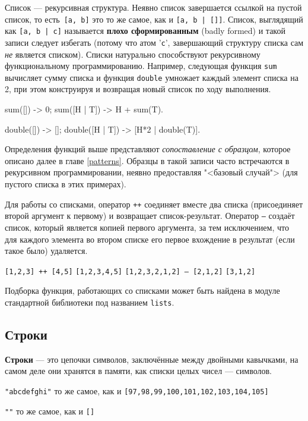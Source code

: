 Список --- рекурсивная структура. Неявно список завершается ссылкой на пустой 
список, то есть~\texttt{[a, b]} это то же самое, как и \texttt{[a, b | []]}. 
Список, выглядящий как \texttt{[a, b | c]} называется \textbf{плохо 
сформированным} (badly formed) и такой записи следует избегать (потому что
атом '\texttt{c}', завершающий структуру списка сам \textit{не} является списком).
Списки натурально способствуют рекурсивному функциональному программированию.
Например, следующая функция \texttt{sum} вычисляет сумму списка и функция 
\texttt{double} умножает каждый элемент списка на 2, при этом конструируя и 
возвращая новый список по ходу выполнения.

\begin{erlang}
sum([]) -> 0;
sum([H | T]) -> H + sum(T).

double([]) -> [];
double([H | T]) -> [H*2 | double(T)].
\end{erlang}

Определения функций выше представляют \textit{сопоставление с образцом}, которое
описано далее в главе \ref{patterns}. Образцы в такой записи часто встречаются в 
рекурсивном программировании, неявно предоставляя "<базовый случай"> (для пустого
списка в этих примерах).

Для работы со списками, оператор \texttt{++} соединяет вместе два списка 
(присоединяет второй аргумент к первому) и возвращает список-результат.  Оператор 
\texttt{--} создаёт список, который является копией первого аргумента, за тем
исключением, что для каждого элемента во втором списке его первое вхождение в
результат (если такое было) удаляется.

\texttt{[1,2,3] ++ [4,5]} \resultingin \texttt{[1,2,3,4,5]}
\texttt{[1,2,3,2,1,2] -- [2,1,2]} \resultingin \texttt{[3,1,2]}

Подборка функция, работающих со списками может быть найдена в модуле стандартной
библиотеки под названием \texttt{lists}.


\subsection{Строки}
\label{datatypes:string}

\textbf{Строки} --- это цепочки символов, заключённые между двойными кавычками,
на самом деле они хранятся в памяти, как списки целых чисел --- символов.

\texttt{"abcdefghi"} то же самое, как и \texttt{[97,98,99,100,101,102,103,104,105]}

\texttt{""} то же самое, как и \texttt{[]}

